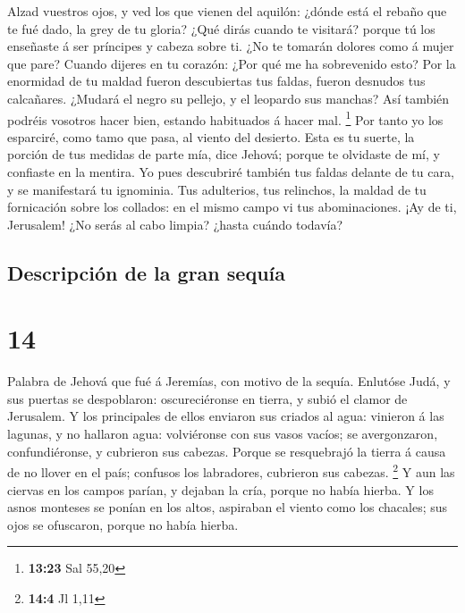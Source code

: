 Alzad vuestros ojos, y ved los que vienen del aquilón:
¿dónde está el rebaño que te fué dado, la grey de tu gloria?
 ¿Qué dirás cuando te visitará? porque tú los enseñaste á
ser príncipes y cabeza sobre ti. ¿No te tomarán dolores como á mujer que
pare?  Cuando dijeres en tu corazón: ¿Por qué me ha
sobrevenido esto? Por la enormidad de tu maldad fueron descubiertas tus
faldas, fueron desnudos tus calcañares.  ¿Mudará el negro
su pellejo, y el leopardo sus manchas? Así también podréis vosotros
hacer bien, estando habituados á hacer mal. \footnote{\textbf{13:23} Sal
  55,20}  Por tanto yo los esparciré, como tamo que pasa,
al viento del desierto.  Esta es tu suerte, la porción de
tus medidas de parte mía, dice Jehová; porque te olvidaste de mí, y
confiaste en la mentira.  Yo pues descubriré también tus
faldas delante de tu cara, y se manifestará tu ignominia.
 Tus adulterios, tus relinchos, la maldad de tu
fornicación sobre los collados: en el mismo campo vi tus abominaciones.
¡Ay de ti, Jerusalem! ¿No serás al cabo limpia? ¿hasta cuándo todavía?

\hypertarget{descripciuxf3n-de-la-gran-sequuxeda}{%
\subsection{Descripción de la gran
sequía}\label{descripciuxf3n-de-la-gran-sequuxeda}}

\hypertarget{section-13}{%
\section{14}\label{section-13}}

 Palabra de Jehová que fué á Jeremías, con motivo de la
sequía.  Enlutóse Judá, y sus puertas se despoblaron:
oscureciéronse en tierra, y subió el clamor de Jerusalem. 
Y los principales de ellos enviaron sus criados al agua: vinieron á las
lagunas, y no hallaron agua: volviéronse con sus vasos vacíos; se
avergonzaron, confundiéronse, y cubrieron sus cabezas. 
Porque se resquebrajó la tierra á causa de no llover en el país;
confusos los labradores, cubrieron sus cabezas. \footnote{\textbf{14:4}
  Jl 1,11}  Y aun las ciervas en los campos parían, y
dejaban la cría, porque no había hierba.  Y los asnos
monteses se ponían en los altos, aspiraban el viento como los chacales;
sus ojos se ofuscaron, porque no había hierba.

